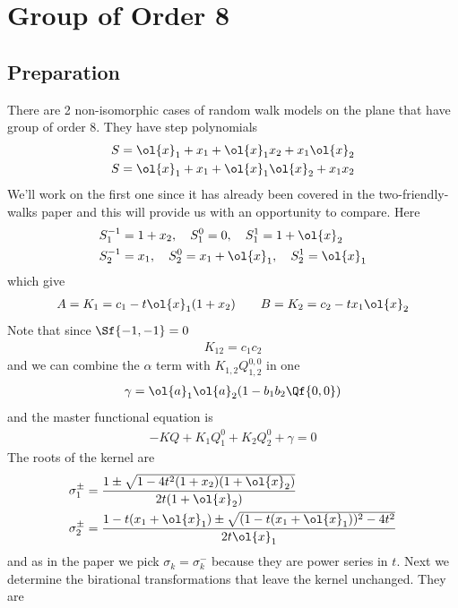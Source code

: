 

\chapter{Group of Order 8}

\section{Preparation}
There are 2 non-isomorphic cases of random walk models on the plane that have group of order 8. They have step polynomials
\begin{align}
S &= \ol{x}_1+x_1+\ol{x}_1x_2+x_1\ol{x}_2\\
S &= \ol{x}_1+x_1+\ol{x}_1\ol{x}_2+x_1x_2
\end{align}
We'll work on the first one since it has already been covered in the two-friendly-walks paper and this will provide us with an opportunity to compare. Here
\begin{align}
	S_1^{-1} &= 1+x_2,\quad S_1^0 = 0,\quad S_1^1 = 1+\ol{x}_2\\
	S_2^{-1} &= x_1,\quad S_2^0 = x_1+\ol{x}_1,\quad S_2^1 = \ol{x}_1
\end{align}
which give
\begin{align}
	A = K_1 = c_1 - t\ol{x}_1(1+x_2)\quad\quad B = K_2 = c_2 - t x_1\ol{x}_2
\end{align}
Note that since $\Sf{-1,-1} = 0$
\begin{align}
	K_{12} = c_1c_2
\end{align}
and we can combine the $\alpha$ term with $K_{1,2}Q_{1,2}^{0,0}$ in one
\begin{align}
	\gamma = \ol{a}_1\ol{a}_2(1-b_1b_2\Qf{0,0})
\end{align}
and the master functional equation is
\begin{align}
-KQ + K_1 Q_1^0 + K_2 Q_2^0 +\gamma = 0
\end{align}
The roots of the kernel are
\begin{align}
	\sigma_1^\pm &= \frac{1\pm\sqrt{1-4t^2(1+x_2)(1+\ol{x}_2)}}{2t(1+\ol{x}_2)}\\
	\sigma_2^\pm &= \frac{1-t(x_1+\ol{x}_1) \pm \sqrt{(1-t(x_1+\ol{x}_1))^2 - 4t^2}}{2t\ol{x}_1}
\end{align}
and as in the paper we pick $\sigma_k = \sigma_k^{-}$ because they are power series in $t$. Next we determine the birational transformations that leave the kernel unchanged. They are
